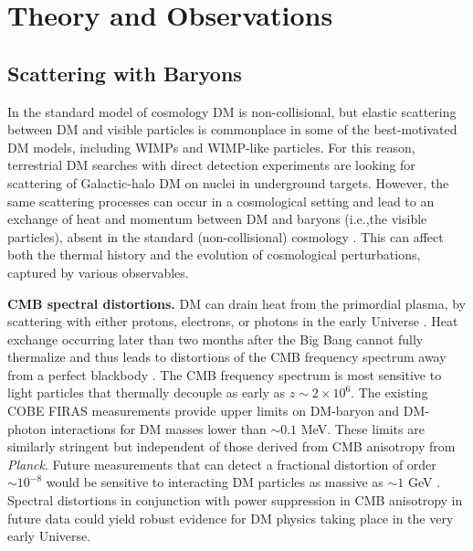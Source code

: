 \documentclass[12pt]{article}
\begin{document}
\section{Theory and Observations}
\label{sec:thobs}
\vspace{-0.2cm}
\subsection{Scattering with Baryons}

In the standard model of cosmology DM is non-collisional, but elastic scattering between DM and visible particles is commonplace in some of the best-motivated DM models, including WIMPs and WIMP-like particles.
For this reason, terrestrial DM searches with direct detection experiments are looking for scattering of Galactic-halo DM on nuclei in underground targets.
However, the same scattering processes can occur in a cosmological setting and lead to an exchange of heat and momentum between DM and baryons (i.e.,the visible particles), absent in the standard (non-collisional) cosmology \cite{Boddy:2018kfv,Gluscevic:2017ywp,Boddy:2018wzy,Xu:2018efh,Slatyer:2018aqg,Dvorkin:2013cea,2001PhLB..518....8B,2005A&A...438..419B,2004NuPhB.683..219B,Sigurdson:2004zp}. 
This can affect both the thermal history and the evolution of cosmological perturbations, captured by various observables.

\textbf{CMB spectral distortions.} 
DM can drain heat from the primordial plasma, by scattering with either protons, electrons, or photons in the early Universe \cite{AliHaimoud_15}.
Heat exchange occurring later than two months after the Big Bang cannot fully thermalize and thus leads to distortions of the CMB frequency spectrum away from a perfect blackbody \cite{Hu_96,2012MNRAS.419.1294C}.  
The CMB frequency spectrum is most sensitive to light particles that thermally decouple as early as $z \sim 2 \times 10^6$.
The existing COBE FIRAS measurements provide upper limits on DM-baryon and DM-photon interactions for DM masses lower than $\sim 0.1$ MeV. 
These limits are similarly stringent but independent of those derived from CMB anisotropy from \textit{Planck}.
Future measurements that can detect a fractional distortion of order $\sim 10^{-8}$ would be sensitive to interacting DM particles as massive as $\sim 1$ GeV \cite{AliHaimoud_15}. 
Spectral distortions in conjunction with power suppression in CMB anisotropy in future data could yield robust evidence for DM physics taking place in the very early Universe.
\end{document}
